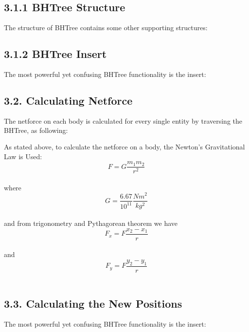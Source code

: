 \documentclass{article}
\begin{document}
\subsection*{3.1.1 BHTree Structure}
The structure of BHTree contains some other supporting structures:\\


\subsection*{3.1.2 BHTree Insert}
The most powerful yet confusing BHTree functionality is the insert:\\


\subsection*{3.2. Calculating Netforce}
The netforce on each body is calculated for every single entity by traversing the BHTree, as following:


As stated above, to calculate the netforce on a body, the Newton's Gravitational Law is Used:
\[F = G \frac{m_1 m_2}{ r^2} \]\\
where\\
\[G = \frac{6.67}{10^{11}} \frac{N m^2}{kg^2}\]\\
and from trigonometry and Pythagorean theorem we have\\
\[F_x = F \frac{x_2 - x_1}{r} \]\\
and \\
\[F_y = F \frac{y_2 - y_1}{r} \]\\


\subsection*{3.3. Calculating the New Positions}
The most powerful yet confusing BHTree functionality is the insert:\\

\end{document}
